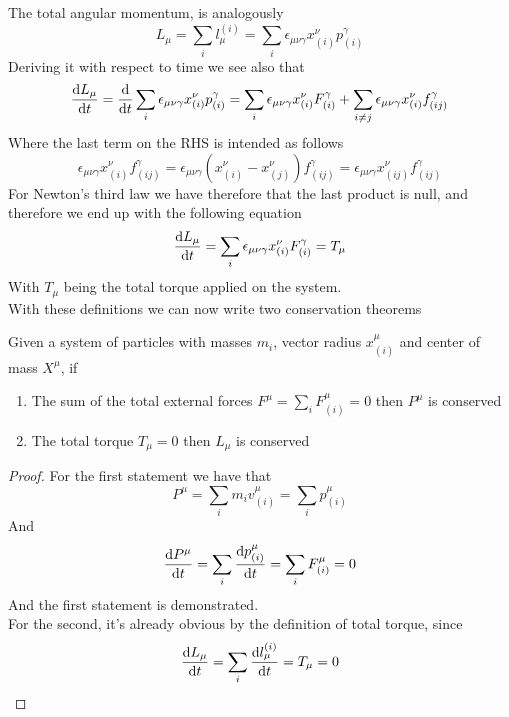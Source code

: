 \documentclass[../admech.tex]{subfiles}
\begin{document}
The total angular momentum, is analogously
\begin{equation}
	L_\mu=\sum_il_\mu^{(i)}=\sum_i\epsilon_{\mu\nu\gamma}x^\nu_{(i)}p^\gamma_{(i)}
	\label{eq:totangmom}
\end{equation}
Deriving it with respect to time we see also that
\begin{equation}
	\dv{L_\mu}{t}=\dv{t}\sum_i\epsilon_{\mu\nu\gamma}x^\nu_{(i)}p^\gamma_{(i)}=\sum_i\epsilon_{\mu\nu\gamma}x_{(i)}^\nu F^\gamma_{(i)}+\sum_{i\ne j}\epsilon_{\mu\nu\gamma}x^\nu_{(i)}f^\gamma_{(ij)}
	\label{eq:torque}
\end{equation}
Where the last term on the RHS is intended as follows
\begin{equation*}
	\epsilon_{\mu\nu\gamma}x^\nu_{(i)}f^\gamma_{(ij)}=\epsilon_{\mu\nu\gamma}(x^\nu_{(i)}-x^\nu_{(j)})f^\gamma_{(ij)}=\epsilon_{\mu\nu\gamma}x^\nu_{(ij)}f^\gamma_{(ij)}
\end{equation*}
For Newton's third law we have therefore that the last product is null, and therefore we end up with the following equation
\begin{equation}
	\dv{L_\mu}{t}=\sum_i\epsilon_{\mu\nu\gamma}x^\nu_{(i)}F_{(i)}^\gamma=T_\mu
	\label{eq:totaltorque}
\end{equation}
With $T_\mu$ being the total torque applied on the system.\\
With these definitions we can now write two conservation theorems
\begin{thm}
	Given a system of particles with masses $m_i$, vector radius $x_{(i)}^\mu$ and center of mass $X^\mu$, if
	\begin{enumerate}
	\item The sum of the total external forces $F^\mu=\sum_iF^\mu_{(i)}=0$ then $P^\mu$ is conserved
	\item The total torque $T_\mu=0$ then $L_\mu$ is conserved
	\end{enumerate}
\end{thm}
\begin{proof}
	For the first statement we have that
	\begin{equation*}
		P^\mu=\sum_im_iv^\mu_{(i)}=\sum_ip_{(i)}^\mu
	\end{equation*}
	And
	\begin{equation*}
		\dv{P^\mu}{t}=\sum_{i}\dv{p^\mu_{(i)}}{t}=\sum_{i}F^\mu_{(i)}=0
	\end{equation*}
	And the first statement is demonstrated.\\
	For the second, it's already obvious by the definition of total torque, since
	\begin{equation*}
		\dv{L_\mu}{t}=\sum_{i}\dv{l_\mu^{(i)}}{t}=T_\mu=0
	\end{equation*}
\end{proof}
\end{document}
